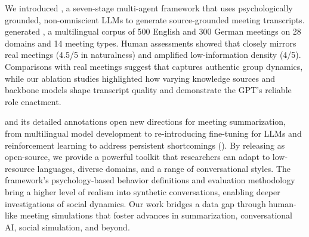 We introduced \pipeline{}, a seven-stage multi-agent framework that uses psychologically grounded, non-omniscient LLMs to generate source-grounded meeting transcripts.
\pipeline{} generated \dataset{}, a multilingual corpus of 500 English and 300 German meetings on 28 domains and 14 meeting types.
Human assessments showed that \dataset{} closely mirrors real meetings (4.5/5 in naturalness) and amplified low-information density (4/5).
Comparisons with real meetings suggest that \dataset{} captures authentic group dynamics, while our ablation studies highlighted how varying knowledge sources and backbone models shape transcript quality and demonstrate the GPT's reliable role enactment.

\dataset{} and its detailed annotations open new directions for meeting summarization, from multilingual model development to re-introducing fine-tuning for LLMs and reinforcement learning to address persistent shortcomings ().
By releasing \pipeline{} as open-source, we provide a powerful toolkit that researchers can adapt to low-resource languages, diverse domains, and a range of conversational styles. 
The framework’s psychology-based behavior definitions and evaluation methodology bring a higher level of realism into synthetic conversations, enabling deeper investigations of social dynamics.
Our work bridges a data gap through human-like meeting simulations that foster advances in summarization, conversational AI, social simulation, and beyond.
